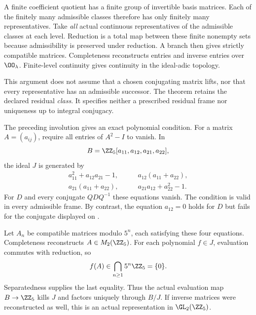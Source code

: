 A finite coefficient quotient has a finite group of invertible basis matrices. Each of the finitely many admissible classes therefore has only finitely many representatives. Take \emph{all} actual continuous representatives of the admissible classes at each level. Reduction is a total map between these finite nonempty sets because admissibility is preserved under reduction. A branch then gives strictly compatible matrices. Completeness reconstructs entries and inverse entries over $\OO_\lambda$. Finite-level continuity gives continuity in the ideal-adic topology.

This argument does not assume that a chosen conjugating matrix lifts, nor that every representative has an admissible successor. The theorem retains the declared residual \emph{class}. It specifies neither a prescribed residual frame nor uniqueness up to integral conjugacy.


The preceding involution gives an exact polynomial condition. For a matrix $A=(a_{ij})$, require all entries of $A^2-I$ to vanish. In
\[
B=\ZZ_5[a_{11},a_{12},a_{21},a_{22}],
\]
the ideal $J$ is generated by
\[
\begin{aligned}
a_{11}^2+a_{12}a_{21}-1,&\qquad a_{12}(a_{11}+a_{22}),\\
a_{21}(a_{11}+a_{22}),&\qquad a_{21}a_{12}+a_{22}^2-1.
\end{aligned}
\]
For $D$ and every conjugate $QDQ^{-1}$ these equations vanish. The condition is valid in every admissible frame. By contrast, the equation $a_{12}=0$ holds for $D$ but fails for the conjugate displayed on .

Let $A_n$ be compatible matrices modulo $5^n$, each satisfying these four equations. Completeness reconstructs $A\in M_2(\ZZ_5)$. For each polynomial $f\in J$, evaluation commutes with reduction, so
\[
f(A)\in\bigcap_{n\ge1}5^n\ZZ_5=\{0\}.
\]
Separatedness supplies the last equality. Thus the actual evaluation map $B\to\ZZ_5$ kills $J$ and factors uniquely through $B/J$. If inverse matrices were reconstructed as well, this is an actual representation in $\GL_2(\ZZ_5)$.

